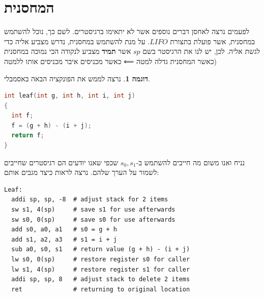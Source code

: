 \documentclass[12pt]{article}
\theoremstyle{plain}
\theoremstyle{definition}
\newtheorem{example}[theorem]{דוגמה}      %
\theoremstyle{remark}
\begin{document}
\section{המחסנית}
לפעמים נרצה לאחסן דברים נוספים אשר לא יתאימו ברגיסטרים.\newline{}
לשם כך, נוכל להשתמש במחסנית, אשר פועלת בתצורת \({LIFO}\). על מנת להשתמש במחסנית, נדרש מצביע אליה כדי לגשת אליה. לכן, יש לנו את הרגיסטר בשם \({sp}\) אשר \textbf{תמיד} מצביע לנקודה הכי נמוכה במחסנית (כאשר המחסנית גדלה למטה ⟸ כאשר מכניסים איבר מכניסים אותו ללמטה\begin{example}
נרצה לממש את הפונקציה הבאה באסמבלי.\begin{LTR}\begin{lstlisting}[language=c]
int leaf(int g, int h, int i, int j)
{
  int f;
  f = (g + h) - (i + j);
  return f;
}

\end{lstlisting}\end{LTR}נניח ואנו משום מה חייבים להשתמש ב-\({s_{0},s_{1}}\) שכפי שאנו יודעים הם רגיסטרים שחייבים לשמור על הערך שלהם.\newline{}
נרצה לראות כיצד מגבים אותם:\begin{LTR}\begin{lstlisting}[language=assembly]
Leaf: 
  addi sp, sp, -8  # adjust stack for 2 items
  sw s1, 4(sp)     # save s1 for use afterwards
  sw s0, 0(sp)     # save s0 for use afterwards
  add s0, a0, a1   # s0 = g + h
  add s1, a2, a3   # s1 = i + j
  sub a0, s0, s1   # return value (g + h) - (i + j)
  lw s0, 0(sp)     # restore register s0 for caller
  lw s1, 4(sp)     # restore register s1 for caller
  addi sp, sp, 8   # adjust stack to delete 2 items
  ret              # returning to original location

\end{lstlisting}\end{LTR}
\end{example}
\end{document}
